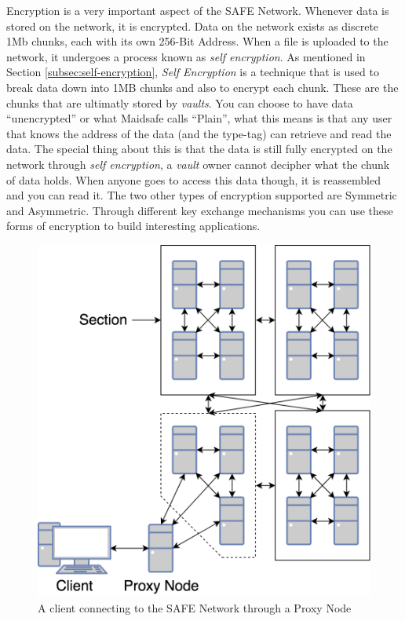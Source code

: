 Encryption is a very important aspect of the SAFE Network. Whenever data is stored on the network, it is encrypted. Data on the network exists as discrete 1Mb chunks, each with its own 256-Bit Address. When a file is uploaded to the network, it undergoes a process known as \textit{self encryption}. As mentioned in Section \ref{subsec:self-encryption}, \textit{Self Encryption} is a technique that is used to break data down into 1MB chunks and also to encrypt each chunk. These are the chunks that are ultimatly stored by \textit{vaults}. You can choose to have data ``unencrypted'' or what Maidsafe calls ``Plain'', what this means is that any user that knows the address of the data (and the type-tag) can retrieve and read the data. The special thing about this is that the data is still fully encrypted on the network through \textit{self encryption}, a \textit{vault} owner cannot decipher what the chunk of data holds. When anyone goes to access this data though, it is reassembled and you can read it. The two other types of encryption supported are Symmetric and Asymmetric. Through different key exchange mechanisms you can use these forms of encryption to build interesting applications.

\begin{figure}
	\begin{center}
		\includegraphics[scale=0.3]{diagrams/safe-network-connection}
		\caption{A client connecting to the SAFE Network through a Proxy Node}
		\label{fig:proxy-connection}
	\end{center}
\end{figure}

